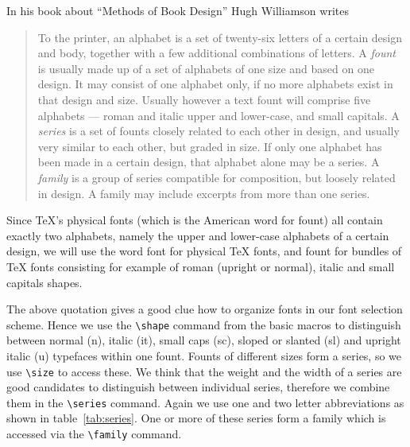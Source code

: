  In his book about ``Methods of Book Design'' Hugh Williamson writes
 \cite{Williamson}
 \begin{quote}
   \missing
   To the printer, an alphabet is a set of twenty-six letters of a
   certain design and body, together with a few additional
   combinations of letters. A {\em fount\/} is usually made up of a
   set of alphabets of one size and based on one design. It may
   consist of one alphabet only, if no more alphabets exist in that
   design and size.  Usually however a text fount will comprise five
   alphabets --- roman and italic upper and lower-case, and small
   capitals.
   \missing
   A {\em series\/} is a set of founts closely related to each other
   in design, and usually very similar to each other, but graded in
   size.  If only one alphabet has been made in a certain design, that
   alphabet alone may be a series.  A {\em family\/} is a group of
   series compatible for composition, but loosely related in design.  A
   family may include excerpts from more than one series.
 \end{quote}

 Since \TeX{}'s physical fonts (which is the American word for
 fount) all contain exactly two alphabets, namely the upper and
 lower-case alphabets of a certain design, we will use the word font
 for physical \TeX{} fonts, and fount for bundles of \TeX{} fonts
 consisting for example of roman (upright or normal), italic and small
 capitals shapes.

 The above quotation gives a good clue how to organize fonts in our
 font selection scheme.  Hence we use the \verb+\shape+ command from
 the basic macros to distinguish between normal (n), italic (it),
 small caps (sc), sloped or slanted (sl) and upright italic (u)
 typefaces within one fount.  Founts of different sizes form a series,
 so we use \verb+\size+ to access these.  We think that the weight and
 the width of a series are good candidates to distinguish between
 individual series, therefore we combine them in the \verb+\series+
 command.  Again we use one and two letter abbreviations as shown in
 table~\ref{tab:series}.  One or more of these series form a family
 which is accessed via the \verb+\family+ command.


